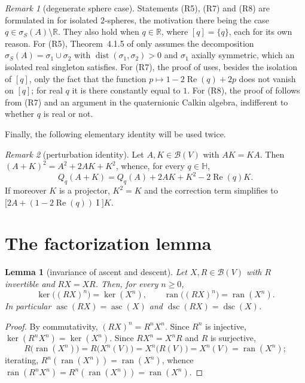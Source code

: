 \documentclass[11pt,a4paper]{article}
\theoremstyle{plain}
\newtheorem{lemma}{Lemma}[section]
\theoremstyle{remark}
\newtheorem{remark}{Remark}[section]
\newcommand{\HH}{\mathbb H}
\newcommand{\RR}{\mathbb R}
\newcommand{\V}{V}
\newcommand{\B}{\mathcal B}
\newcommand{\sS}{\sigma_S}
\DeclareMathOperator{\ran}{ran}
\DeclareMathOperator{\asc}{asc}
\DeclareMathOperator{\dsc}{dsc}
\DeclareMathOperator{\Id}{I}
\newcommand{\Qq}[1]{Q_q(#1)}
\begin{document}
\begin{remark}[degenerate sphere case]\label{rem:reel}
Statements (R5), (R7) and (R8) are formulated in \cite{BJZ24} for isolated $2$-spheres, the motivation there being the case $q\in\sS(A)\setminus\RR$. They also hold when $q\in\RR$, where $[q]=\{q\}$, each for its own reason. For (R5), Theorem~4.1.5 of \cite{CGK} only assumes the decomposition $\sS(A)=\sigma_1\cup\sigma_2$ with $\operatorname{dist}(\sigma_1,\sigma_2)>0$ and $\sigma_1$ axially symmetric, which an isolated real singleton satisfies. For (R7), the proof of \cite[Prop.~3.7]{BJZ24} uses, besides the isolation of $[q]$, only the fact that the function $p\mapsto 1-2\operatorname{Re}(q)+2p$ does not vanish on $[q]$; for real $q$ it is there constantly equal to $1$. For (R8), the proof of \cite[Prop.~3.8]{BJZ24} follows from (R7) and an argument in the quaternionic Calkin algebra, indifferent to whether $q$ is real or not.
\end{remark}

Finally, the following elementary identity will be used twice.

\begin{remark}[perturbation identity]\label{rem:pert}
Let $A,K\in\B(\V)$ with $AK=KA$. Then $(A+K)^2=A^2+2AK+K^2$, whence, for every $q\in\HH$,
\begin{equation}\label{eq:pert}
\Qq{A+K}=\Qq{A}+2AK+K^2-2\operatorname{Re}(q)K .
\end{equation}
If moreover $K$ is a projector, $K^2=K$ and the correction term simplifies to $\big[2A+(1-2\operatorname{Re}(q))\Id\big]K$.
\end{remark}

\section{The factorization lemma}\label{sec:fact}

\begin{lemma}[invariance of ascent and descent]\label{lem:invar}
Let $X,R\in\B(\V)$ with $R$ invertible and $RX=XR$. Then, for every $n\ge0$,
\[
\ker\big((RX)^n\big)=\ker(X^n),\qquad \ran\big((RX)^n\big)=\ran(X^n).
\]
In particular $\asc(RX)=\asc(X)$ and $\dsc(RX)=\dsc(X)$.
\end{lemma}

\begin{proof}
By commutativity, $(RX)^n=R^nX^n$. Since $R^n$ is injective, $\ker(R^nX^n)=\ker(X^n)$. Since $RX^n=X^nR$ and $R$ is surjective,
\[
R\big(\ran(X^n)\big)=R\big(X^n(\V)\big)=X^n\big(R(\V)\big)=X^n(\V)=\ran(X^n);
\]
iterating, $R^n(\ran(X^n))=\ran(X^n)$, whence $\ran(R^nX^n)=R^n(\ran(X^n))=\ran(X^n)$.
\end{proof}
\end{document}
